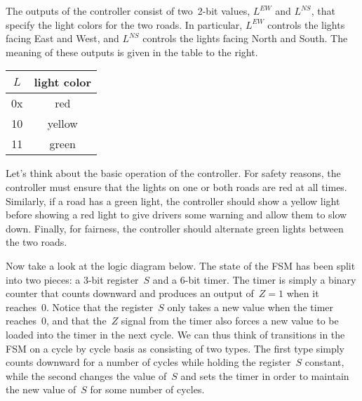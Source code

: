 \begin{minipage}{5.15in}
The outputs of the controller consist of two~\mbox{2-bit} values, 
$L^{EW}$ and $L^{NS}$, that specify the light colors for the two roads.
In particular, $L^{EW}$ controls the lights facing East and West, and
$L^{NS}$ controls the lights facing North and South.  The meaning of these
outputs is given in the table to the right.
\end{minipage}\hspace{0.25in}%
\begin{minipage}{1.1in}
\begin{tabular}{c|c}
$L$& light color\\ \hline
0x& red\\
10& yellow\\
11& green\\
\end{tabular}
\end{minipage}\vspace{12pt}

Let's think about the basic operation of the controller.
%
For safety reasons, the controller must ensure that the lights on one
or both roads are red at all times.  
%
Similarly, if a road has a green light, the controller should 
show a yellow light before showing a red light to give drivers some
warning and allow them to slow down.
%
Finally, for fairness, the controller should alternate green lights
between the two roads.

Now take a look at the logic diagram below.
%
The state of the FSM has been split into two pieces: a \mbox{3-bit} 
register~$S$ and a \mbox{6-bit} timer.  The timer is simply a binary 
counter that counts downward and produces an output of~$Z=1$ when it 
reaches~0.  Notice that the register~$S$ only takes a new value
when the timer reaches~0, and that the~$Z$ signal from the timer
also forces a new value to be loaded into the timer in the next 
cycle.  We can thus think of transitions in the FSM on a cycle by 
cycle basis as consisting of two types.  The first type simply
counts downward for a number of cycles while holding the register~$S$
constant, while the second changes the value of~$S$ and sets the
timer in order to maintain the new value of~$S$ 
for some number of cycles.\\

\centerline{}\vspace{12pt}


